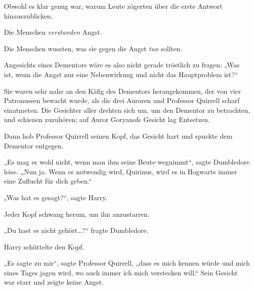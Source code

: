 Obwohl es klar genug war, warum Leute zögerten über die erste Antwort hinauszublicken.

Die Menschen \emph{verstanden} Angst.

Die Menschen wussten, was sie gegen die Angst \emph{tun} sollten.

Angesichts eines Dementors wäre es also nicht gerade tröstlich zu fragen: „Was ist, wenn die Angst nur eine Nebenwirkung und nicht das Hauptproblem ist?“

Sie waren sehr nahe an den Käfig des Dementors herangekommen, der von vier Patronussen bewacht wurde, als die drei Auroren und Professor Quirrell scharf einatmeten. Die Gesichter aller drehten sich um, um den Dementor zu betrachten, und schienen zuzuhören; auf Auror Goryanofs Gesicht lag Entsetzen.

Dann hob Professor Quirrell seinen Kopf, das Gesicht hart und spuckte dem Dementor entgegen.

„Es mag es wohl nicht, wenn man ihm seine Beute wegnimmt“, sagte Dumbledore leise. „Nun ja. Wenn es notwendig wird, Quirinus, wird es in Hogwarts immer eine Zuflucht für dich geben.“

„Was hat es gesagt?“, sagte Harry.

Jeder Kopf schwang herum, um ihn anzustarren.

„Du hast es nicht gehört…?“ fragte Dumbledore.

Harry schüttelte den Kopf.

„Es sagte zu mir“, sagte Professor Quirrell, „dass es mich kennen würde und mich eines Tages jagen wird, wo auch immer ich mich verstecken will.“ Sein Gesicht war starr und zeigte keine Angst.

